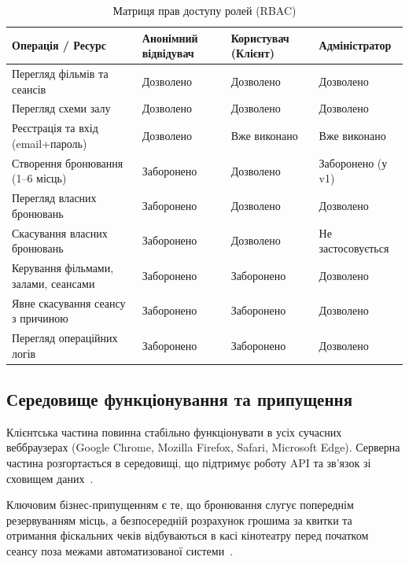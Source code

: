 \begin{table}[htbp]
\caption{Матриця прав доступу ролей (RBAC)}\label{tab:rbac-matrix}
\centering
\begin{tabularx}{\textwidth}{@{}X >{\centering\arraybackslash}p{2.8cm} >{\centering\arraybackslash}p{2.6cm} >{\centering\arraybackslash}p{2.8cm}@{}}
\toprule
\textbf{Операція / Ресурс} & \textbf{Анонімний відвідувач} & \textbf{Користувач (Клієнт)} & \textbf{Адміністратор} \\
\midrule
Перегляд фільмів та сеансів & Дозволено & Дозволено & Дозволено \\
Перегляд схеми залу & Дозволено & Дозволено & Дозволено \\
Реєстрація та вхід (email+пароль) & Дозволено & Вже виконано & Вже виконано \\
Створення бронювання (1--6 місць) & Заборонено & Дозволено & Заборонено (у v1) \\
Перегляд власних бронювань & Заборонено & Дозволено & Дозволено \\
Скасування власних бронювань & Заборонено & Дозволено & Не застосовується \\
Керування фільмами, залами, сеансами & Заборонено & Заборонено & Дозволено \\
Явне скасування сеансу з причиною & Заборонено & Заборонено & Дозволено \\
Перегляд операційних логів & Заборонено & Заборонено & Дозволено \\
\bottomrule
\end{tabularx}
\end{table}

\subsection{Середовище функціонування та припущення}\label{sec:opis-seredovyshche}
Клієнтська частина повинна стабільно функціонувати в усіх сучасних веббраузерах (Google Chrome, Mozilla Firefox, Safari, Microsoft Edge). Серверна частина розгортається в середовищі, що підтримує роботу API та зв'язок зі сховищем даних~.

Ключовим бізнес-припущенням є те, що бронювання слугує попереднім резервуванням місць, а безпосередній розрахунок грошима за квитки та отримання фіскальних чеків відбуваються в касі кінотеатру перед початком сеансу поза межами автоматизованої системи~.

